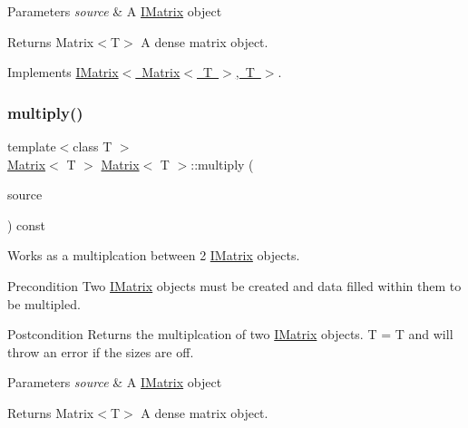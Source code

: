 \begin{DoxyParams}{Parameters}
{\em source} & A \mbox{\hyperlink{class_i_matrix}{I\+Matrix}} object \\
\hline
\end{DoxyParams}
\begin{DoxyReturn}{Returns}
Matrix$<$\+T$>$ A dense matrix object. 
\end{DoxyReturn}


Implements \mbox{\hyperlink{class_i_matrix_aa4d4f7ce2daec7d68ff8fd590652544d}{I\+Matrix$<$ Matrix$<$ T $>$, T $>$}}.

\mbox{\label{class_matrix_a26704cc156b59005206365eb6a008b41}} 
\subsubsection{\texorpdfstring{multiply()}{multiply()}\hspace{0.1cm}{\footnotesize\ttfamily [2/6]}}
{\footnotesize\ttfamily template$<$class T $>$ \\
\mbox{\hyperlink{class_matrix}{Matrix}}$<$ T $>$ \mbox{\hyperlink{class_matrix}{Matrix}}$<$ T $>$\+::multiply (\begin{DoxyParamCaption}\item[{const \mbox{\hyperlink{class_i_matrix}{I\+Matrix}}$<$ \mbox{\hyperlink{class_t_matrix}{T\+Matrix}}$<$ T $>$, T $>$ \&}]{source }\end{DoxyParamCaption}) const}



Works as a multiplcation between 2 \mbox{\hyperlink{class_i_matrix}{I\+Matrix}} objects. 

\begin{DoxyPrecond}{Precondition}
Two \mbox{\hyperlink{class_i_matrix}{I\+Matrix}} objects must be created and data filled within them to be multipled. 
\end{DoxyPrecond}
\begin{DoxyPostcond}{Postcondition}
Returns the multiplcation of two \mbox{\hyperlink{class_i_matrix}{I\+Matrix}} objects. T = T and will throw an error if the sizes are off.
\end{DoxyPostcond}

\begin{DoxyParams}{Parameters}
{\em source} & A \mbox{\hyperlink{class_i_matrix}{I\+Matrix}} object \\
\hline
\end{DoxyParams}
\begin{DoxyReturn}{Returns}
Matrix$<$\+T$>$ A dense matrix object. 
\end{DoxyReturn}
\mbox{\label{class_matrix_a1e2f2e670f13fb5cf119c1a9ab853f41}} 
